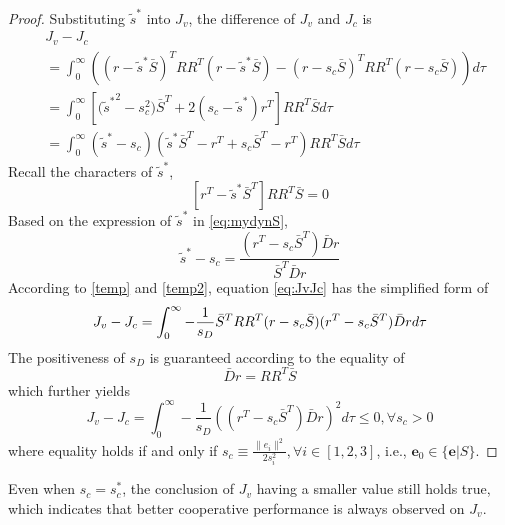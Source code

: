 \documentclass[times]{rncauth}
\begin{document}
\begin{proof}
  Substituting $\tilde{s}^*$ into $J_v$, the difference of $J_v$ and
  $J_c$ is
  \begin{align}
    &J_v-J_c\nonumber\\
    &=\int_0^\infty\left((r-\tilde{s}^*\bar{S})^TRR^T(r-\tilde{s}^*\bar{S})-
(r-s_c\bar{S})^TRR^T(r-s_c\bar{S})\right)d\tau\nonumber\\
           &=\int_0^\infty[{(\tilde{s}^*}^2-s_c^2)\bar{S}^T+2(s_c-\tilde{s}^*)r^T]RR^T\bar{S}d\tau\nonumber\\
           &=\int_0^\infty(\tilde{s}^*-s_c)(\tilde{s}^*\bar{S}^T-r^T+s_c\bar{S}^T-r^T)RR^T\bar{S}d\tau
           \label{eq:JvJc}
  \end{align}
Recall the characters of $\tilde{s}^*$,
\begin{equation}\label{temp}
[r^T-\tilde{s}^*\bar{S}^T]
  R R^T \bar{S}=0
  \end{equation}
Based on the expression of $\tilde{s}^*$ in \eqref{eq:mydynS},
\begin{equation}\label{temp2}
  \tilde{s}^*-s_c=\frac{(r^T-s_c\bar{S}^T)\bar{D}r}{\bar{S}^T\bar{D}r}
\end{equation}
According to \eqref{temp} and \eqref{temp2}, equation
\eqref{eq:JvJc} has the simplified form of
  \begin{equation}
    J_v-J_c=\int_0^\infty -\frac{1}{s_D}\bar{S}^TRR^T(r-s_c\bar{S})(r^T-s_c\bar{S}^T)\bar{D}rd\tau\nonumber\\
  \end{equation}
  The positiveness of $s_D$ is guaranteed according to the equality of
  $$\bar{D}r=RR^T\bar{S}$$ which further
  yields
  \begin{equation}
    J_v-J_c=\int_0^\infty -\frac{1}{s_D}((r^T-s_c\bar{S}^T)\bar{D}r)^2d\tau\leq0,\forall s_c>0
  \end{equation}
  where equality holds if and only if $s_c\equiv\frac{\|e_i\|^2}{2s_i^2},\forall i\in[1,2,3]$,
i.e., $\mathbf{e}_0\in \{\mathbf{e}|S\}$.
\end{proof}

 Even when $s_c=s^*_c$, the conclusion of $J_v$ having a smaller
value still holds true, which indicates that better
cooperative performance is always observed on $J_v$.
\end{document}

